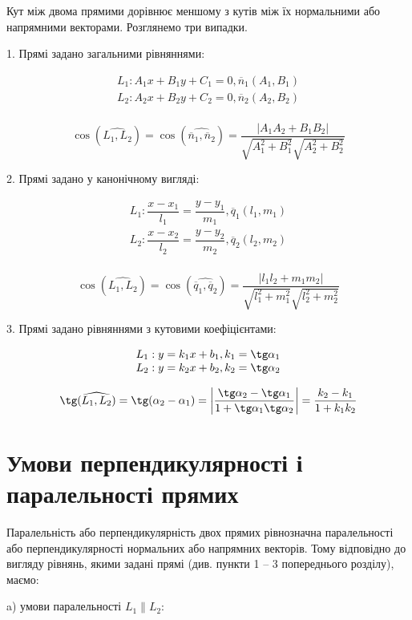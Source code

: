 Кут між двома прямими дорівнює меншому з кутів між їх нормальними або
напрямними векторами. Розглянемо три випадки.

1. Прямі задано загальними рівняннями:

$$\begin{array}{l}
	L_1: A_1x + B_1y + C_1 = 0, \overline{n}_1(A_1,B_1) \\
	L_2: A_2x + B_2y + C_2 = 0, \overline{n}_2(A_2,B_2) \\
\end{array}$$

$$\cos(\widehat{L_1,L_2}) = \cos(\widehat{\overline{n}_1, \overline{n}_2}) = \dfrac{|A_1A_2 + B_1B_2|}{\sqrt{A_1^2+ B_1^2}\sqrt{A_2^2+ B_2^2}}$$

2. Прямі задано у канонічному вигляді:

$$\begin{array}{l}
	L_1: \dfrac{x - x_1}{l_1} = \dfrac{y - y_1}{m_1}, \overline{q}_1(l_1,m_1) \\
	L_2: \dfrac{x - x_2}{l_2} = \dfrac{y - y_2}{m_2}, \overline{q}_2(l_2,m_2) \\
\end{array}$$

$$\cos(\widehat{L_1,L_2}) = \cos(\widehat{\overline{q}_1, \overline{q}_2}) = \dfrac{|l_1l_2 + m_1m_2|}{\sqrt{l_1^2+ m_1^2}\sqrt{l_2^2+ m_2^2}}$$

3. Прямі задано рівняннями з кутовими коефіцієнтами: 

$$\begin{array}{l}
	L_1: y = k_1x + b_1, k_1 = \tg\alpha_1 \\
	L_2: y = k_2x + b_2, k_2 = \tg\alpha_2 \\
\end{array}$$

$$\tg(\widehat{L_1,L_2}) = \tg(\alpha_2 - \alpha_1) = \left|\dfrac{\tg\alpha_2 - \tg\alpha_1}{1+\tg\alpha_1\tg\alpha_2}\right| = \dfrac{k_2 - k_1}{1+k_1k_2}$$

\section{Умови перпендикулярності і паралельності прямих}

Паралельність або перпендикулярність двох прямих рівнозначна
паралельності або перпендикулярності нормальних або напрямних векторів. Тому
відповідно до вигляду рівнянь, якими задані прямі (див. пункти 1 – 3 попереднього
розділу), маємо:

a) умови паралельності $L_1 \parallel L_2$:

